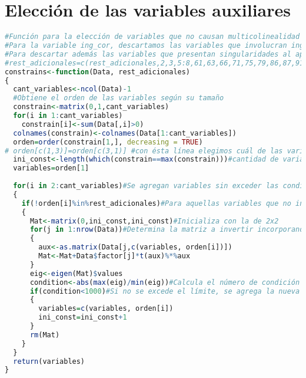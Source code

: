 \documentclass[a4paper,twoside,openright,12pt]{book}
\theoremstyle{definition}
\numberwithin{equation}{chapter}
\numberwithin{figure}{chapter}
\numberwithin{table}{chapter}
\numberwithin{theorem}{chapter}
\numberwithin{lemma}{chapter}
\begin{document}
\chapter{Elección de las variables auxiliares}\label{anx:D}
\begin{lstlisting}[language=R]
#Función para la elección de variables que no causan multicolinealidad
#Para la variable ing_cor, descartamos las variables que involucran ingresos, al llamar la función con rest_adicionales=c(24:55,57,110:113, 115)-13
#Para descartar además las variables que presentan singularidades al aplicar lm y aquellas que son sumas o sumandos de otras variables consideradas, añadimos
#rest_adicionales=c(rest_adicionales,2,3,5:8,61,63,66,71,75,79,86,87,91,95,96,113,114)
constrains<-function(Data, rest_adicionales)
{
  cant_variables<-ncol(Data)-1
  #Obtiene el orden de las variables según su tamaño
  constrain<-matrix(0,1,cant_variables)
  for(i in 1:cant_variables)
    constrain[i]<-sum(Data[,i]>0)
  colnames(constrain)<-colnames(Data[1:cant_variables])
  orden=order(constrain[1,], decreasing = TRUE)
# orden[c(1,3)]=orden[c(3,1)] #con ésta línea elegimos cuál de las variables de mayor tamaño será la inicial para el proceso
  ini_const<-length(which(constrain==max(constrain)))#cantidad de variables con el tamaño mayor
  variables=orden[1]
  
  for(i in 2:cant_variables)#Se agregan variables sin exceder las condiciones descritas
  {
    if(!orden[i]%in%rest_adicionales)#Para aquellas variables que no involucran ingresos,
    {
      Mat<-matrix(0,ini_const,ini_const)#Inicializa con la de 2x2
      for(j in 1:nrow(Data))#Determina la matriz a invertir incorporando información de toda la base de datos
      {
        aux<-as.matrix(Data[j,c(variables, orden[i])])
        Mat<-Mat+Data$factor[j]*t(aux)%*%aux
      }
      eig<-eigen(Mat)$values
      condition<-abs(max(eig)/min(eig))#Calcula el número de condición de la matriz obtenida
      if(condition<1000)#Si no se excede el límite, se agrega la nueva variable
      {
        variables=c(variables, orden[i])
        ini_const=ini_const+1
      }
      rm(Mat)
    }
  }
  return(variables)
}
\end{lstlisting}
\end{document}
